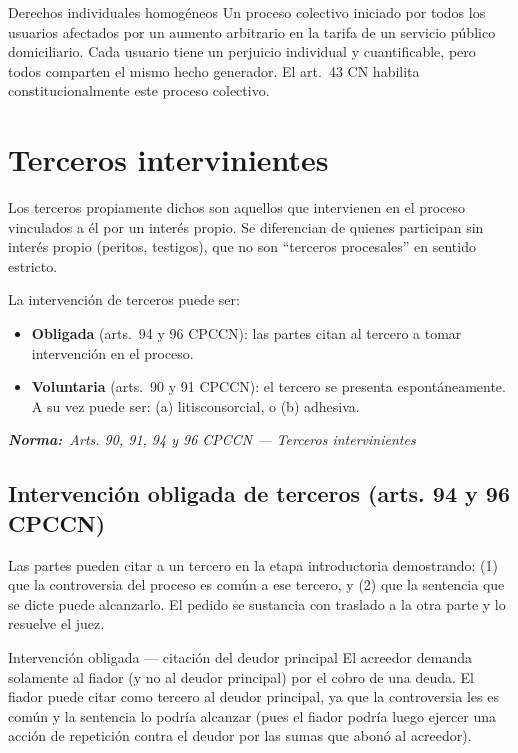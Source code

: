 \documentclass[12pt,oneside]{book}
\newcommand{\normaref}[1]{%
    \par\noindent\textbf{\textit{Norma:}}~\textit{#1}\par\vspace{0.2em}
}
\begin{document}
\begin{example}{Derechos individuales homogéneos}
Un proceso colectivo iniciado por todos los usuarios afectados por un aumento arbitrario en la tarifa de un servicio público domiciliario. Cada usuario tiene un perjuicio individual y cuantificable, pero todos comparten el mismo hecho generador. El art.\ 43 CN habilita constitucionalmente este proceso colectivo.
\end{example}

\section{Terceros intervinientes}

Los terceros propiamente dichos son aquellos que intervienen en el proceso vinculados a él por un interés propio. Se diferencian de quienes participan sin interés propio (peritos, testigos), que no son ``terceros procesales'' en sentido estricto.

La intervención de terceros puede ser:

\begin{itemize}
    \item \textbf{Obligada} (arts.\ 94 y 96 CPCCN): las partes citan al tercero a tomar intervención en el proceso.
    \item \textbf{Voluntaria} (arts.\ 90 y 91 CPCCN): el tercero se presenta espontáneamente. A su vez puede ser: (a) litisconsorcial, o (b) adhesiva.
\end{itemize}

\normaref{Arts. 90, 91, 94 y 96 CPCCN --- Terceros intervinientes}

\subsection{Intervención obligada de terceros (arts. 94 y 96 CPCCN)}

Las partes pueden citar a un tercero en la etapa introductoria demostrando: (1) que la controversia del proceso es común a ese tercero, y (2) que la sentencia que se dicte puede alcanzarlo. El pedido se sustancia con traslado a la otra parte y lo resuelve el juez.

\begin{example}{Intervención obligada --- citación del deudor principal}
El acreedor demanda solamente al fiador (y no al deudor principal) por el cobro de una deuda. El fiador puede citar como tercero al deudor principal, ya que la controversia les es común y la sentencia lo podría alcanzar (pues el fiador podría luego ejercer una acción de repetición contra el deudor por las sumas que abonó al acreedor).
\end{example}
\end{document}
